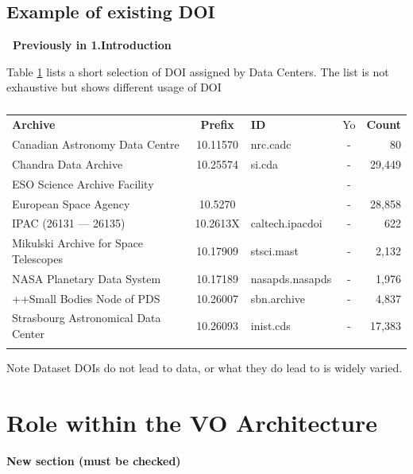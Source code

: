 \documentclass[11pt,a4paper]{ivoa}
\begin{document}
\subsection{Example of existing DOI}
\textbf{\color{red} Previously in 1.Introduction}

Table \ref{tab:astroDOIs1} lists a short selection of DOI assigned by Data Centers. The list is not exhaustive but shows different usage of DOI  


\begin{table}[th]
\begin{tabular}{lclcr}
\sptablerule
\textbf{Archive} & \textbf{Prefix} & \textbf{ID} & Yo & \textbf{Count} \\
\sptablerule
Canadian Astronomy Data Centre        & 10.11570 & nrc.cadc        & - &     80   \\
Chandra Data Archive                  & 10.25574 & si.cda          & - & 29,449   \\
ESO Science Archive Facility          &          &                 & - &          \\
European Space Agency                 & 10.5270  &                 & - & 28,858   \\
IPAC (26131 --- 26135)                & 10.2613X & caltech.ipacdoi & - &    622   \\
Mikulski Archive for Space Telescopes & 10.17909 & stsci.mast      & - &  2,132   \\
NASA Planetary Data System            & 10.17189 & nasapds.nasapds & - &  1,976   \\
++Small Bodies Node of PDS            & 10.26007 & sbn.archive     & - &  4,837   \\
Strasbourg Astronomical Data Center   & 10.26093 & inist.cds       & - & 17,383   \\
\sptablerule
\end{tabular}%
\caption{\label{tab:astroDOIs1}}
\end{table}


\begin{admonition}{Note}
Dataset DOIs do not lead to data, or what they do lead to is widely varied.
\end{admonition}

\section{Role within the VO Architecture}
\textbf{\color{red}New section (must be checked)}
\end{document}
